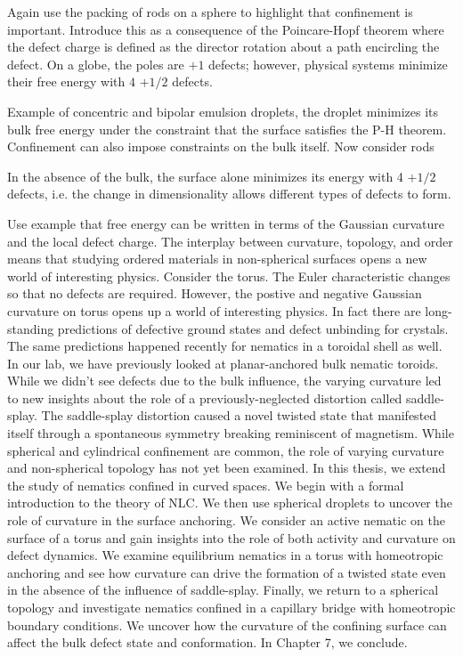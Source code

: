 Again use the packing of rods on a sphere to highlight that confinement is important. 
Introduce this as a consequence of the Poincare-Hopf theorem where the defect charge is defined as the director rotation about a path encircling the defect.
On a globe, the poles are $+1$ defects; however, physical systems minimize their free energy with $4$ $+1/2$ defects.


Example of concentric and bipolar emulsion droplets, the droplet minimizes its bulk free energy under the constraint that the surface satisfies the P-H theorem.
Confinement can also impose constraints on the bulk itself.
Now consider rods

In the absence of the bulk, the surface alone minimizes its energy with 4 $+1/2$ defects, i.e. the change in dimensionality allows different types of defects to form.

Use example that free energy can be written in terms of the Gaussian curvature and the local defect charge.
The interplay between curvature, topology, and order means that studying ordered materials in non-spherical surfaces opens a new world of interesting physics.
Consider the torus.
The Euler characteristic changes so that no defects are required.
However, the postive and negative Gaussian curvature on torus opens up a world of interesting physics.
In fact there are long-standing predictions of defective ground states and defect unbinding for crystals.
The same predictions happened recently for nematics in a toroidal shell as well.
In our lab, we have previously looked at planar-anchored bulk nematic toroids.
While we didn't see defects due to the bulk influence, the varying curvature led to new insights about the role of a previously-neglected distortion called saddle-splay.
The saddle-splay distortion caused a novel twisted state that manifested itself through a spontaneous symmetry breaking reminiscent of magnetism.
While spherical and cylindrical confinement are common, the role of varying curvature and non-spherical topology has not yet been examined.
In this thesis, we extend the study of nematics confined in curved spaces.
We begin with a formal introduction to the theory of NLC.
We then use spherical droplets to uncover the role of curvature in the surface anchoring.
We consider an active nematic on the surface of a torus and gain insights into the role of both activity and curvature on defect dynamics.
We examine equilibrium nematics in a torus with homeotropic anchoring and see how curvature can drive the formation of a twisted state even in the absence of the influence of saddle-splay.
Finally, we return to a spherical topology and investigate nematics confined in a capillary bridge with homeotropic boundary conditions.
We uncover how the curvature of the confining surface can affect the bulk defect state and conformation.
In Chapter 7, we conclude.
